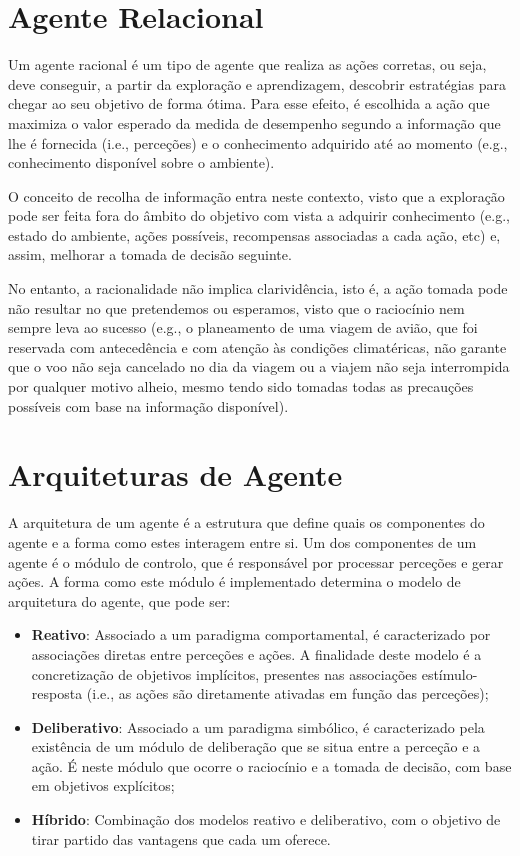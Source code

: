 \section{Agente Relacional}\label{sec:agente-relacional}

Um agente racional é um tipo de agente que realiza as ações corretas, ou seja, deve conseguir, a partir da exploração e aprendizagem, descobrir estratégias para chegar ao seu objetivo de forma ótima.
Para esse efeito, é escolhida a ação que maximiza o valor esperado da medida de desempenho segundo a informação que lhe é fornecida (i.e., perceções) e o conhecimento adquirido até ao momento (e.g., conhecimento disponível sobre o ambiente).

O conceito de recolha de informação entra neste contexto, visto que a exploração pode ser feita fora do âmbito do objetivo com vista a adquirir conhecimento (e.g., estado do ambiente, ações possíveis, recompensas associadas a cada ação, etc) e, assim, melhorar a tomada de decisão seguinte.

No entanto, a racionalidade não implica clarividência, isto é, a ação tomada pode não resultar no que pretendemos ou esperamos, visto que o raciocínio nem sempre leva ao sucesso (e.g., o planeamento de uma viagem de avião, que foi reservada com antecedência e com atenção às condições climatéricas, não garante que o voo não seja cancelado no dia da viagem ou a viajem não seja interrompida por qualquer motivo alheio, mesmo tendo sido tomadas todas as precauções possíveis com base na informação disponível).


\section{Arquiteturas de Agente}\label{sec:arquiteturas-agente}

A arquitetura de um agente é a estrutura que define quais os componentes do agente e a forma como estes interagem entre si.
Um dos componentes de um agente é o módulo de controlo, que é responsável por processar perceções e gerar ações.
A forma como este módulo é implementado determina o modelo de arquitetura do agente, que pode ser:

\begin{itemize}
    \item \textbf{Reativo}: Associado a um paradigma comportamental, é caracterizado por associações diretas entre perceções e ações.
    A finalidade deste modelo é a concretização de objetivos implícitos, presentes nas associações estímulo-resposta (i.e., as ações são diretamente ativadas em função das perceções);
    \item \textbf{Deliberativo}: Associado a um paradigma simbólico, é caracterizado pela existência de um módulo de deliberação que se situa entre a perceção e a ação.
    É neste módulo que ocorre o raciocínio e a tomada de decisão, com base em objetivos explícitos;
    \item \textbf{Híbrido}: Combinação dos modelos reativo e deliberativo, com o objetivo de tirar partido das vantagens que cada um oferece.
\end{itemize}
